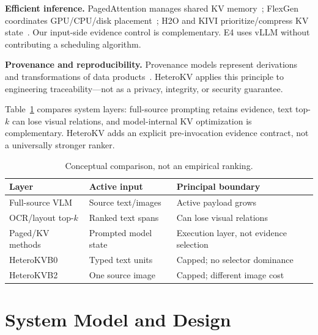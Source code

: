 ﻿\documentclass[conference]{IEEEtran}
\newcommand{\system}{HeteroKV\xspace}
\newcommand{\bzero}{\textsc{B0}\xspace}
\newcommand{\btwo}{\textsc{B2}\xspace}
\begin{document}
\textbf{Efficient inference.} PagedAttention manages shared KV memory~\cite{kwon2023pagedattention}; FlexGen coordinates GPU/CPU/disk placement~\cite{sheng2023flexgen}; H2O and KIVI prioritize/compress KV state~\cite{zhang2023h2o,liu2024kivi}. Our input-side evidence control is complementary. E4 uses vLLM without contributing a scheduling algorithm.

\textbf{Provenance and reproducibility.} Provenance models represent derivations and transformations of data products~\cite{moreau2011provenance}. \system applies this principle to engineering traceability---not as a privacy, integrity, or security guarantee.

Table~\ref{tab:paradigms} compares system layers: full-source prompting retains evidence, text top-$k$ can lose visual relations, and model-internal KV optimization is complementary. \system adds an explicit pre-invocation evidence contract, not a universally stronger ranker.

\begin{table}[!t]
\centering
\caption{Conceptual comparison, not an empirical ranking.}
\label{tab:paradigms}
\scriptsize
\setlength{\tabcolsep}{2.4pt}
\begin{tabular}{p{}p{}p{}}
\toprule
Layer & Active input & Principal boundary \\
\midrule
Full-source VLM & Source text/images & Active payload grows \\
OCR/layout top-$k$ & Ranked text spans & Can lose visual relations \\
Paged/KV methods & Prompted model state & Execution layer, not evidence selection \\
\system \bzero & Typed text units & Capped; no selector dominance \\
\system \btwo & One source image & Capped; different image cost \\
\bottomrule
\end{tabular}
\end{table}

\section{System Model and Design}
\end{document}
